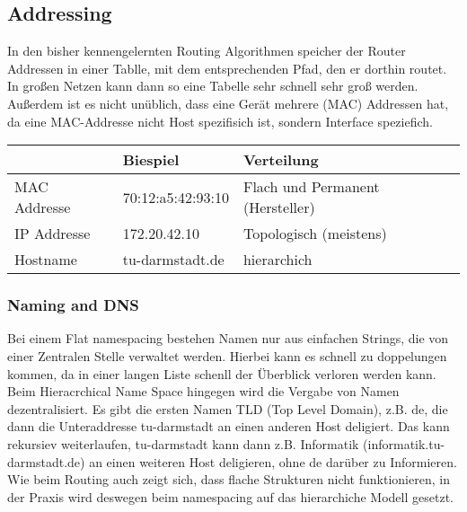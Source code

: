	\subsection{Addressing}
		In den bisher kennengelernten Routing Algorithmen speicher der Router Addressen in einer Tablle, mit dem entsprechenden Pfad, den er dorthin routet. In großen Netzen kann dann so eine Tabelle sehr schnell sehr groß werden. Außerdem ist es nicht unüblich, dass eine Gerät mehrere (MAC) Addressen hat, da eine MAC-Addresse nicht Host spezifisich ist, sondern Interface speziefich. 
		
		\begin{table}[h]
			\centering
			\begin{tabular}{|l|l|l|}
				\hline
						 & Biespiel          & Verteilung                       \\ \hline \hline
			MAC Addresse & 70:12:a5:42:93:10 & Flach und Permanent (Hersteller) \\ \hline
			IP Addresse  & 172.20.42.10      & Topologisch (meistens)           \\ \hline
			Hostname     & tu-darmstadt.de   & hierarchich                     \\ \hline
			\end{tabular}
		\end{table}

		\subsubsection{Naming and DNS}
			Bei einem Flat namespacing bestehen Namen nur aus einfachen Strings, die von einer Zentralen Stelle verwaltet werden. Hierbei kann es schnell zu doppelungen kommen, da in einer langen Liste schenll der Überblick verloren werden kann. \\
			Beim Hieracrchical Name Space hingegen wird die Vergabe von Namen dezentralisiert. Es gibt die ersten Namen TLD (Top Level Domain), z.B. de, die dann die Unteraddresse tu-darmstadt an einen anderen Host deligiert. Das kann rekursiev weiterlaufen, tu-darmstadt kann dann z.B. Informatik (informatik.tu-darmstadt.de) an einen weiteren Host deligieren, ohne de darüber zu Informieren. Wie beim Routing auch zeigt sich, dass flache Strukturen nicht funktionieren, in der Praxis wird deswegen beim namespacing auf das hierarchiche Modell gesetzt. 

